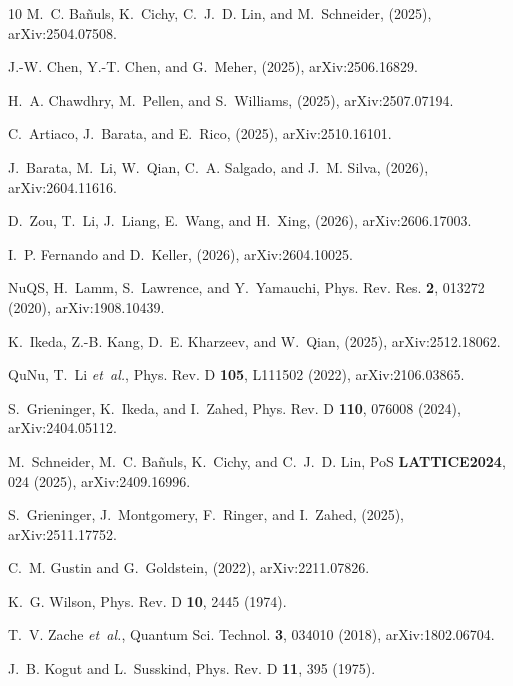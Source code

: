 \documentclass[aps,prd,twocolumn,superscriptaddress,notitlepage,nofootinbib,preprintnumbers]{revtex4-1}
\begin{document}
\begin{thebibliography}{10}
M.~C. Ba{\~n}uls, K.~Cichy, C.~J.~D. Lin, and M.~Schneider,
\newblock (2025), arXiv:2504.07508.

J.-W. Chen, Y.-T. Chen, and G.~Meher,
\newblock (2025), arXiv:2506.16829.

H.~A. Chawdhry, M.~Pellen, and S.~Williams,
\newblock (2025), arXiv:2507.07194.

C.~Artiaco, J.~Barata, and E.~Rico,
\newblock (2025), arXiv:2510.16101.

J.~Barata, M.~Li, W.~Qian, C.~A. Salgado, and J.~M. Silva,
\newblock (2026), arXiv:2604.11616.

D.~Zou, T.~Li, J.~Liang, E.~Wang, and H.~Xing,
\newblock (2026), arXiv:2606.17003.

I.~P. Fernando and D.~Keller,
\newblock (2026), arXiv:2604.10025.

NuQS, H.~Lamm, S.~Lawrence, and Y.~Yamauchi,
\newblock Phys. Rev. Res. {\bf 2}, 013272 (2020), arXiv:1908.10439.

K.~Ikeda, Z.-B. Kang, D.~E. Kharzeev, and W.~Qian,
\newblock (2025), arXiv:2512.18062.

QuNu, T.~Li {\em et~al.},
\newblock Phys. Rev. D {\bf 105}, L111502 (2022), arXiv:2106.03865.

S.~Grieninger, K.~Ikeda, and I.~Zahed,
\newblock Phys. Rev. D {\bf 110}, 076008 (2024), arXiv:2404.05112.

M.~Schneider, M.~C. Ba{\~n}uls, K.~Cichy, and C.~J.~D. Lin,
\newblock PoS {\bf LATTICE2024}, 024 (2025), arXiv:2409.16996.

S.~Grieninger, J.~Montgomery, F.~Ringer, and I.~Zahed,
\newblock (2025), arXiv:2511.17752.

C.~M. Gustin and G.~Goldstein,
\newblock (2022), arXiv:2211.07826.

K.~G. Wilson,
\newblock Phys. Rev. D {\bf 10}, 2445 (1974).

T.~V. Zache {\em et~al.},
\newblock Quantum Sci. Technol. {\bf 3}, 034010 (2018), arXiv:1802.06704.

J.~B. Kogut and L.~Susskind,
\newblock Phys. Rev. D {\bf 11}, 395 (1975).


\end{thebibliography}
\end{document}
